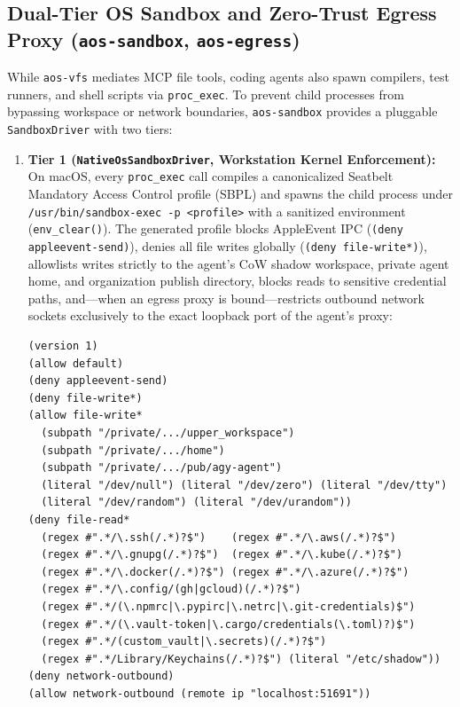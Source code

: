 \documentclass[10pt,twocolumn]{article}
\begin{document}
\subsection{Dual-Tier OS Sandbox and Zero-Trust Egress Proxy (\texttt{aos-sandbox}, \texttt{aos-egress})}
\label{sec:sandbox}

While \texttt{aos-vfs} mediates MCP file tools, coding agents also spawn compilers, test runners, and shell scripts via \texttt{proc\_exec}. To prevent child processes from bypassing workspace or network boundaries, \texttt{aos-sandbox} provides a pluggable \texttt{SandboxDriver} with two tiers:

\begin{enumerate}
    \item \textbf{Tier 1 (\texttt{NativeOsSandboxDriver}, Workstation Kernel Enforcement):} On macOS, every \texttt{proc\_exec} call compiles a canonicalized Seatbelt Mandatory Access Control profile (SBPL) and spawns the child process under \texttt{/usr/bin/sandbox-exec -p <profile>} with a sanitized environment (\texttt{env\_clear()}). The generated profile blocks AppleEvent IPC (\texttt{(deny appleevent-send)}), denies all file writes globally (\texttt{(deny file-write*)}), allowlists writes strictly to the agent's CoW shadow workspace, private agent home, and organization publish directory, blocks reads to sensitive credential paths, and---when an egress proxy is bound---restricts outbound network sockets exclusively to the exact loopback port of the agent's proxy:
\begin{lstlisting}
(version 1)
(allow default)
(deny appleevent-send)
(deny file-write*)
(allow file-write*
  (subpath "/private/.../upper_workspace")
  (subpath "/private/.../home")
  (subpath "/private/.../pub/agy-agent")
  (literal "/dev/null") (literal "/dev/zero") (literal "/dev/tty")
  (literal "/dev/random") (literal "/dev/urandom"))
(deny file-read*
  (regex #".*/\.ssh(/.*)?$")    (regex #".*/\.aws(/.*)?$")
  (regex #".*/\.gnupg(/.*)?$")  (regex #".*/\.kube(/.*)?$")
  (regex #".*/\.docker(/.*)?$") (regex #".*/\.azure(/.*)?$")
  (regex #".*/\.config/(gh|gcloud)(/.*)?$")
  (regex #".*/(\.npmrc|\.pypirc|\.netrc|\.git-credentials)$")
  (regex #".*/(\.vault-token|\.cargo/credentials(\.toml)?)$")
  (regex #".*/(custom_vault|\.secrets)(/.*)?$")
  (regex #".*/Library/Keychains(/.*)?$") (literal "/etc/shadow"))
(deny network-outbound)
(allow network-outbound (remote ip "localhost:51691"))
\end{lstlisting}

\end{enumerate}
\end{document}
